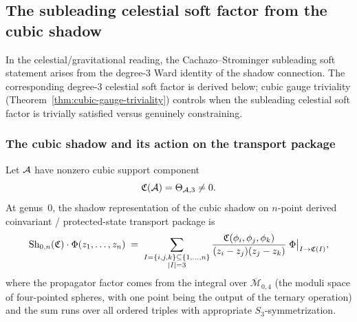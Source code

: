 %
%

\subsection{The subleading celestial soft factor from the cubic shadow}
\label{subsec:thqg-VI-subleading-soft}

In the celestial/gravitational reading, the Cachazo--Strominger
subleading soft statement arises from the degree-$3$ Ward
identity of the shadow connection. The
corresponding degree-$3$ celestial soft factor is derived below; cubic gauge triviality
(Theorem~\ref{thm:cubic-gauge-triviality}) controls when the
subleading celestial soft factor is trivially satisfied versus
genuinely constraining.

\subsubsection{The cubic shadow and its action on the transport package}

\begin{proposition}
Let $\mathcal{A}$ have nonzero cubic support component
\[
\mathfrak{C}(\mathcal{A})=\Theta_{\mathcal{A},3}\neq0 .
\]
At genus~$0$, the shadow representation of the cubic shadow on
$n$-point derived coinvariant / protected-state transport package is
\begin{equation}%
\Sh_{0,n}(\mathfrak{C}) \cdot \Phi(z_1, \dotsc, z_n)
\;=\;
\sum_{\substack{I = \{i,j,k\} \subseteq \{1,\dotsc,n\} \\
 |I| = 3}}
\frac{\mathfrak{C}(\phi_i, \phi_j, \phi_k)}
 {(z_i - z_j)(z_j - z_k)}\;
\Phi\bigl|_{I \to \mathfrak{C}(I)},
\end{equation}
where the propagator factor comes from the integral over
$\overline{\mathcal{M}}_{0,4}$ (the moduli space of four-pointed
spheres, with one point being the output of the ternary operation)
and the sum runs over all ordered triples with appropriate
$S_3$-symmetrization.
\end{proposition}

